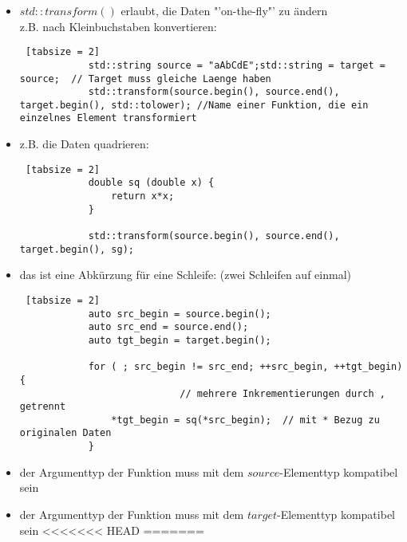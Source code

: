 \documentclass{article}
\begin{document}
	\begin{itemize}
		\item $std::transform()$ erlaubt, die Daten "'on-the-fly"' zu ändern \\
		z.B. nach Kleinbuchstaben konvertieren:
		\begin{lstlisting} [tabsize = 2]
			std::string source = "aAbCdE";std::string = target = source;  // Target muss gleiche Laenge haben
			std::transform(source.begin(), source.end(), target.begin(), std::tolower); //Name einer Funktion, die ein einzelnes Element transformiert
		\end{lstlisting}
		
		\item z.B. die Daten quadrieren:
		\begin{lstlisting} [tabsize = 2]
			double sq (double x) {
				return x*x;
			}
			
			std::transform(source.begin(), source.end(), target.begin(), sg);
		\end{lstlisting}
		
		\item das ist eine Abkürzung für eine Schleife: (zwei Schleifen auf einmal)
		\begin{lstlisting} [tabsize = 2]
			auto src_begin = source.begin();
			auto src_end = source.end();
			auto tgt_begin = target.begin();
			
			for ( ; src_begin != src_end; ++src_begin, ++tgt_begin) {  
							// mehrere Inkrementierungen durch , getrennt
				*tgt_begin = sq(*src_begin);  // mit * Bezug zu originalen Daten
			}
		\end{lstlisting}
		
		\item der Argumenttyp der Funktion muss mit dem $source$-Elementtyp kompatibel sein
		\item der Argumenttyp der Funktion muss mit dem $target$-Elementtyp kompatibel sein
<<<<<<< HEAD
=======
	

\end{itemize}
\end{document}
